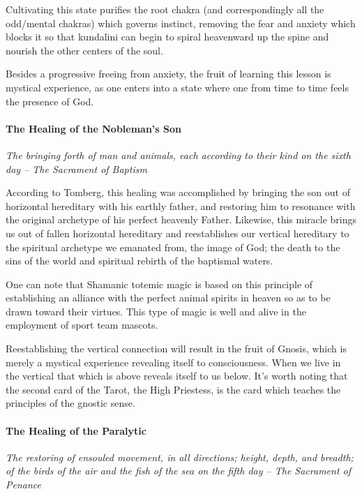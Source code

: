 Cultivating this state purifies the root chakra (and correspondingly all the odd/mental chakras) which governs instinct, removing the fear and anxiety which blocks it so that kundalini can begin to spiral heavenward up the spine and nourish the other centers of the soul.

Besides a progressive freeing from anxiety, the fruit of learning this lesson is mystical experience, as one enters into a state where one from time to time feels the presence of God.

\paragraph{The Healing of the Nobleman's Son}


\emph{The bringing forth of man and animals, each according to their kind on the sixth day -- The Sacrament of Baptism}

According to Tomberg, this healing was accomplished by bringing the son out of horizontal hereditary with his earthly father, and restoring him to resonance with the original archetype of his perfect heavenly Father. Likewise, this miracle brings us out of fallen horizontal hereditary and reestablishes our vertical hereditary to the spiritual archetype we emanated from, the image of God; the death to the sins of the world and spiritual rebirth of the baptismal waters.

One can note that Shamanic totemic magic is based on this principle of establishing an alliance with the perfect animal spirits in heaven so as to be drawn toward their virtues. This type of magic is well and alive in the employment of sport team mascots.

Reestablishing the vertical connection will result in the fruit of Gnosis, which is merely a mystical experience revealing itself to consciousness. When we live in the vertical that which is above reveals itself to us below. It's worth noting that the second card of the Tarot, the High Priestess, is the card which teaches the principles of the gnostic sense.

\paragraph{The Healing of the Paralytic}


\emph{The restoring of ensouled movement, in all directions; height, depth, and breadth; of the birds of the air and the fish of the sea on the fifth day -- The Sacrament of Penance}

